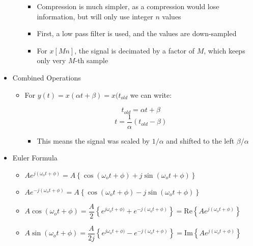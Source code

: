 \begin{itemize}
\begin{itemize}
\begin{itemize}
          \item Compression is much simpler, as a compression would lose information, but will only use integer $n$ values

          \item First, a low pass filter is used, and the values are down-sampled

          \item For $x[Mn]$, the signal is decimated by a factor of $M$, which keeps only very $M$-th sample

        \end{itemize}

    \end{itemize}

  \item Combined Operations

    \begin{itemize}

      \item For $y(t)=x(\alpha t + \beta)=x(t_{old}$ we can write:

          $$t_{old}=\alpha t + \beta$$
          $$t=\frac{1}{\alpha}\left( t_{old}-\beta \right)$$

          \begin{itemize}

            \item This means the signal was scaled by $1/\alpha$ and shifted to the left $\beta/\alpha$

          \end{itemize}

    \end{itemize}

  \item Euler Formula

    \begin{itemize}

      \item $Ae^{j(\omega_o t+\phi)}=A\left\{ \cos(\omega_o t+\phi)+j\sin(\omega_o t+\phi) \right\}$

      \item $Ae^{-j(\omega_o t+\phi)}=A\left\{ \cos(\omega_o t+\phi)-j\sin(\omega_o t+\phi) \right\}$

      \item $A\cos(\omega_o t+\phi)=\dfrac{A}{2}\left\{ e^{j\omega_o t+\phi)}+e^{-j(\omega_o t+\phi)} \right\}=\text{Re}\left\{ Ae^{j(\omega_o t+\phi)} \right\}$

      \item $A\sin(\omega_o t+\phi)=\dfrac{A}{2j}\left\{ e^{j\omega_o t+\phi)}-e^{-j(\omega_o t+\phi)} \right\}=\text{Im}\left\{ Ae^{j(\omega_o t+\phi)} \right\}$


\end{itemize}
\end{itemize}
